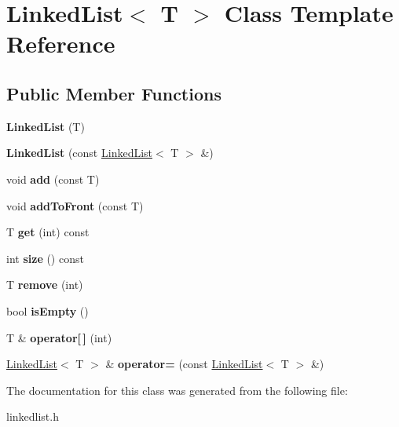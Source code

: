 \hypertarget{classLinkedList}{}\section{Linked\+List$<$ T $>$ Class Template Reference}
\label{classLinkedList}
\subsection*{Public Member Functions}
\begin{DoxyCompactItemize}
\item 
{\bfseries Linked\+List} (T)\hypertarget{classLinkedList_a41e4c3a1bad7c4af82510d1fac7c837b}{}\label{classLinkedList_a41e4c3a1bad7c4af82510d1fac7c837b}

\item 
{\bfseries Linked\+List} (const \hyperlink{classLinkedList}{Linked\+List}$<$ T $>$ \&)\hypertarget{classLinkedList_ac2202e6d63e9bf07c679b2049f0f172a}{}\label{classLinkedList_ac2202e6d63e9bf07c679b2049f0f172a}

\item 
void {\bfseries add} (const T)\hypertarget{classLinkedList_abae6da7eac36513c649cd5160eb85b8c}{}\label{classLinkedList_abae6da7eac36513c649cd5160eb85b8c}

\item 
void {\bfseries add\+To\+Front} (const T)\hypertarget{classLinkedList_aadd2a652140703a1d7de5a5db1d7e7a0}{}\label{classLinkedList_aadd2a652140703a1d7de5a5db1d7e7a0}

\item 
T {\bfseries get} (int) const \hypertarget{classLinkedList_a9dbe395bc8e89f175aaee389bb97e2df}{}\label{classLinkedList_a9dbe395bc8e89f175aaee389bb97e2df}

\item 
int {\bfseries size} () const \hypertarget{classLinkedList_a1d41dc6acb9222b8dcef37485fbbf0dd}{}\label{classLinkedList_a1d41dc6acb9222b8dcef37485fbbf0dd}

\item 
T {\bfseries remove} (int)\hypertarget{classLinkedList_aaac67bee6732a36f7b143a1c4ecc1ca1}{}\label{classLinkedList_aaac67bee6732a36f7b143a1c4ecc1ca1}

\item 
bool {\bfseries is\+Empty} ()\hypertarget{classLinkedList_a7ecbb28e82117a680839ed0dc28ebdce}{}\label{classLinkedList_a7ecbb28e82117a680839ed0dc28ebdce}

\item 
T \& {\bfseries operator\mbox{[}$\,$\mbox{]}} (int)\hypertarget{classLinkedList_ab43bddb7bb6a6315767c9037b6133f51}{}\label{classLinkedList_ab43bddb7bb6a6315767c9037b6133f51}

\item 
\hyperlink{classLinkedList}{Linked\+List}$<$ T $>$ \& {\bfseries operator=} (const \hyperlink{classLinkedList}{Linked\+List}$<$ T $>$ \&)\hypertarget{classLinkedList_a552b56a2641353d6e6487512b094b883}{}\label{classLinkedList_a552b56a2641353d6e6487512b094b883}

\end{DoxyCompactItemize}


The documentation for this class was generated from the following file\+:\begin{DoxyCompactItemize}
\item 
linkedlist.\+h\end{DoxyCompactItemize}
